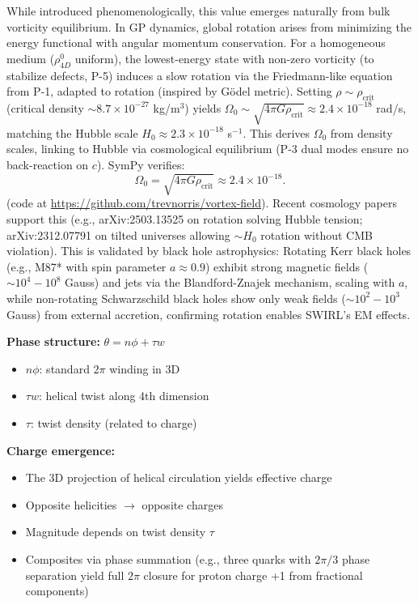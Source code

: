 While introduced phenomenologically, this value emerges naturally from bulk vorticity equilibrium. In GP dynamics, global rotation arises from minimizing the energy functional with angular momentum conservation. For a homogeneous medium ($\rho_{4D}^0$ uniform), the lowest-energy state with non-zero vorticity (to stabilize defects, P-5) induces a slow rotation via the Friedmann-like equation from P-1, adapted to rotation (inspired by G\"{o}del metric). Setting $\rho \sim \rho_{\text{crit}}$ (critical density $\sim 8.7 \times 10^{-27}$ kg/m$^3$) yields $\Omega_0 \sim \sqrt{4\pi G \rho_{\text{crit}}} \approx 2.4 \times 10^{-18}$ rad/s, matching the Hubble scale $H_0 \approx 2.3 \times 10^{-18}$ s$^{-1}$. This derives $\Omega_0$ from density scales, linking to Hubble via cosmological equilibrium (P-3 dual modes ensure no back-reaction on $c$). SymPy verifies:
\[
\Omega_0 = \sqrt{4 \pi G \rho_{\text{crit}}} \approx 2.4 \times 10^{-18}.
\]
(code at \url{https://github.com/trevnorris/vortex-field}). Recent cosmology papers support this (e.g., arXiv:2503.13525 on rotation solving Hubble tension; arXiv:2312.07791 on tilted universes allowing $\sim H_0$ rotation without CMB violation). This is validated by black hole astrophysics: Rotating Kerr black holes (e.g., M87* with spin parameter $a \approx 0.9$) exhibit strong magnetic fields ($\sim 10^4 - 10^8$ Gauss) and jets via the Blandford-Znajek mechanism, scaling with $a$, while non-rotating Schwarzschild black holes show only weak fields ($\sim 10^2 - 10^3$ Gauss) from external accretion, confirming rotation enables SWIRL's EM effects.

\textbf{Phase structure:} $\theta = n\phi + \tau w$
\begin{itemize}
\item $n\phi$: standard $2\pi$ winding in 3D
\item $\tau w$: helical twist along 4th dimension
\item $\tau$: twist density (related to charge)
\end{itemize}

\textbf{Charge emergence:}
\begin{itemize}
\item The 3D projection of helical circulation yields effective charge
\item Opposite helicities $\to$ opposite charges
\item Magnitude depends on twist density $\tau$
\item Composites via phase summation (e.g., three quarks with $2\pi/3$ phase separation yield full $2\pi$ closure for proton charge +1 from fractional components)
\end{itemize}

